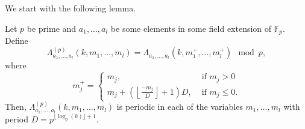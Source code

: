 We start with the following lemma.

\begin{lemma}
\label{lambdaperiod}
 Let $p$ be prime and $a_1,\ldots, a_l$ be some elements in some field extension of $\mathbb{F}_p$.  Define
 \begin{equation}
  \Lambda^{(p)}_{a_1,\ldots,a_l}(k,m_1,\ldots,m_l)= \Lambda_{a_1,\ldots,a_l}(k,m_1^{+},\ldots,m_l^{+})\mod p,
\end{equation}
where 
$$m_j^{+} = \begin{cases}
 m_j, & \text{ if }m_j>0 \\
 m_j + \left(\left\lfloor\frac{-m_j}{D}\right\rfloor+1\right)D, & \text{ if }m_j\leq 0.
\end{cases}
$$
Then, $\Lambda^{(p)}_{a_1,\ldots, a_l}(k,m_1,\ldots,m_l)$ is periodic in each of the variables $m_1,\ldots, m_l$ with period $D=p^{\lfloor\log_p(k)\rfloor+1}$.
\end{lemma}

